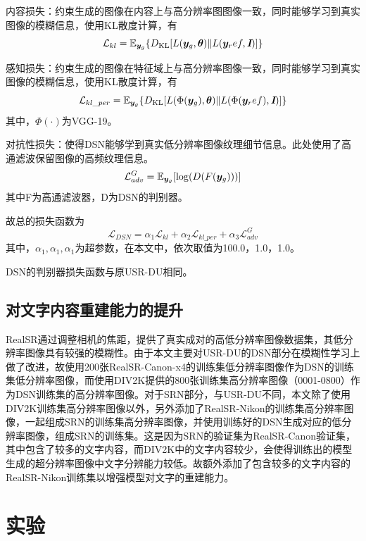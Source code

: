 内容损失：约束生成的图像在内容上与高分辨率图图像一致，同时能够学习到真实图像的模糊信息，使用KL散度计算，有
\begin{equation}
    \mathcal{L}_{kl}=\mathbb{E}_{\vb*{y}_g}\{D_{\text{KL}}[L(\vb*{y}_g,\bm{\theta})\|L(\vb*{y}_ref,\textbf{\em I})]\}
\end{equation}

感知损失：约束生成的图像在特征域上与高分辨率图像一致，同时能够学习到真实图像的模糊信息，使用KL散度计算，有
\begin{equation}
    \mathcal{L}_{kl\_per}=\mathbb{E}_{\vb*{y}_g}\{D_{\text{KL}}[L(\Phi(\vb*{y}_g),\bm{\theta})\|L(\Phi(\vb*{y}_ref),\textbf{\em I})]\}
\end{equation}
其中，$\Phi(\cdot)$为VGG-19\parencite{simonyan2014very}。

对抗性损失：使得DSN能够学到真实低分辨率图像纹理细节信息。此处使用了高通滤波保留图像的高频纹理信息。
\begin{equation}
    \mathcal{L}_{adv}^G=\mathbb{E}_{\vb*{y}_g}[\log(D(F(\vb*{y}_g)))]
\end{equation}
其中F为高通滤波器，D为DSN的判别器。

故总的损失函数为
\begin{equation}
    \mathcal{L}_{DSN} = \alpha_1\mathcal{L}_{kl}+\alpha_2\mathcal{L}_{kl\_per}+\alpha_3\mathcal{L}_{adv}^G
\end{equation}
其中，$\alpha_1,\alpha_1,\alpha_1$为超参数，在本文中，依次取值为100.0，1.0，1.0。

DSN的判别器损失函数与原USR-DU相同。

\subsection{对文字内容重建能力的提升}
RealSR通过调整相机的焦距，提供了真实成对的高低分辨率图像数据集，其低分辨率图像具有较强的模糊性。由于本文主要对USR-DU的DSN部分在模糊性学习上做了改进，故使用200张RealSR-Canon-x4的训练集低分辨率图像作为DSN的训练集低分辨率图像，而使用DIV2K提供的800张训练集高分辨率图像（0001-0800）作为DSN训练集的高分辨率图像。对于SRN部分，与USR-DU不同，本文除了使用DIV2K训练集高分辨率图像以外，另外添加了RealSR-Nikon的训练集高分辨率图像，一起组成SRN的训练集高分辨率图像，并使用训练好的DSN生成对应的低分辨率图像，组成SRN的训练集。这是因为SRN的验证集为RealSR-Canon验证集，其中包含了较多的文字内容，而DIV2K中的文字内容较少，会使得训练出的模型生成的超分辨率图像中文字分辨能力较低。故额外添加了包含较多的文字内容的RealSR-Nikon训练集以增强模型对文字的重建能力。
\section{实验}
